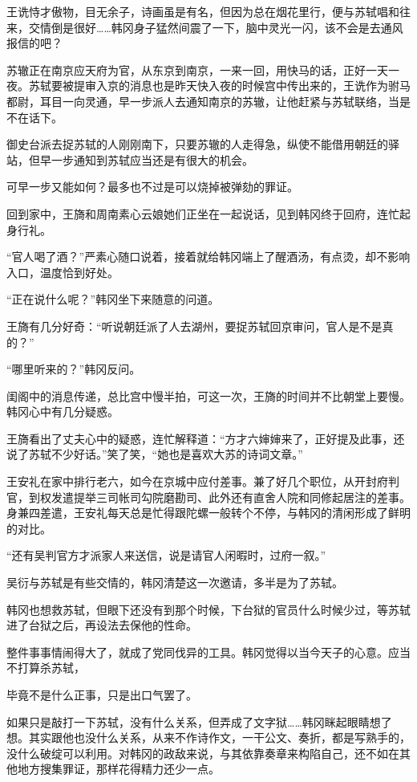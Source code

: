 王诜恃才傲物，目无余子，诗画虽是有名，但因为总在烟花里行，便与苏轼唱和往来，交情倒是很好……韩冈身子猛然间震了一下，脑中灵光一闪，该不会是去通风报信的吧？

苏辙正在南京应天府为官，从东京到南京，一来一回，用快马的话，正好一天一夜。苏轼要被提审入京的消息也是昨天快入夜的时候宫中传出来的，王诜作为驸马都尉，耳目一向灵通，早一步派人去通知南京的苏辙，让他赶紧与苏轼联络，当是不在话下。

御史台派去捉苏轼的人刚刚南下，只要苏辙的人走得急，纵使不能借用朝廷的驿站，但早一步通知到苏轼应当还是有很大的机会。

可早一步又能如何？最多也不过是可以烧掉被弹劾的罪证。

回到家中，王旖和周南素心云娘她们正坐在一起说话，见到韩冈终于回府，连忙起身行礼。

“官人喝了酒？”严素心随口说着，接着就给韩冈端上了醒酒汤，有点烫，却不影响入口，温度恰到好处。

“正在说什么呢？”韩冈坐下来随意的问道。

王旖有几分好奇：“听说朝廷派了人去湖州，要捉苏轼回京审问，官人是不是真的？”

“哪里听来的？”韩冈反问。

闺阁中的消息传递，总比宫中慢半拍，可这一次，王旖的时间并不比朝堂上要慢。韩冈心中有几分疑惑。

王旖看出了丈夫心中的疑惑，连忙解释道：“方才六婶婶来了，正好提及此事，还说了苏轼不少好话。”笑了笑，“她也是喜欢大苏的诗词文章。”

王安礼在家中排行老六，如今在京城中应付差事。兼了好几个职位，从开封府判官，到权发遣提举三司帐司勾院磨勘司、此外还有直舍人院和同修起居注的差事。身兼四差遣，王安礼每天总是忙得跟陀螺一般转个不停，与韩冈的清闲形成了鲜明的对比。

“还有吴判官方才派家人来送信，说是请官人闲暇时，过府一叙。”

吴衍与苏轼是有些交情的，韩冈清楚这一次邀请，多半是为了苏轼。

韩冈也想救苏轼，但眼下还没有到那个时候，下台狱的官员什么时候少过，等苏轼进了台狱之后，再设法去保他的性命。

整件事事情闹得大了，就成了党同伐异的工具。韩冈觉得以当今天子的心意。应当不打算杀苏轼，

毕竟不是什么正事，只是出口气罢了。

如果只是敲打一下苏轼，没有什么关系，但弄成了文字狱……韩冈眯起眼睛想了想。其实跟他也没什么关系，从来不作诗作文，一干公文、奏折，都是写熟手的，没什么破绽可以利用。对韩冈的政敌来说，与其依靠奏章来构陷自己，还不如在其他地方搜集罪证，那样花得精力还少一点。

